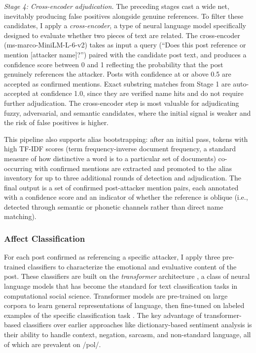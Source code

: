 \documentclass[12pt]{article}
\begin{document}
\textit{Stage 4: Cross-encoder adjudication.} The preceding stages cast a wide net, inevitably producing false positives alongside genuine references. To filter these candidates, I apply a \textit{cross-encoder}, a type of neural language model specifically designed to evaluate whether two pieces of text are related. The cross-encoder (ms-marco-MiniLM-L-6-v2) takes as input a query (``Does this post reference or mention [attacker name]?'') paired with the candidate post text, and produces a confidence score between 0 and 1 reflecting the probability that the post genuinely references the attacker. Posts with confidence at or above 0.5 are accepted as confirmed mentions. Exact substring matches from Stage 1 are auto-accepted at confidence 1.0, since they are verified name hits and do not require further adjudication. The cross-encoder step is most valuable for adjudicating fuzzy, adversarial, and semantic candidates, where the initial signal is weaker and the risk of false positives is higher.

This pipeline also supports alias bootstrapping: after an initial pass, tokens with high TF-IDF scores (term frequency-inverse document frequency, a standard measure of how distinctive a word is to a particular set of documents) co-occurring with confirmed mentions are extracted and promoted to the alias inventory for up to three additional rounds of detection and adjudication. The final output is a set of confirmed post-attacker mention pairs, each annotated with a confidence score and an indicator of whether the reference is oblique (i.e., detected through semantic or phonetic channels rather than direct name matching).

\subsubsection{Affect Classification}

For each post confirmed as referencing a specific attacker, I apply three pre-trained classifiers to characterize the emotional and evaluative content of the post. These classifiers are built on the \textit{transformer} architecture \parencite{vaswani2017attention}, a class of neural language models that has become the standard for text classification tasks in computational social science. Transformer models are pre-trained on large corpora to learn general representations of language, then fine-tuned on labeled examples of the specific classification task \parencite[e.g., sentiment analysis;][]{devlin2019bert}. The key advantage of transformer-based classifiers over earlier approaches like dictionary-based sentiment analysis is their ability to handle context, negation, sarcasm, and non-standard language, all of which are prevalent on /pol/.
\end{document}
